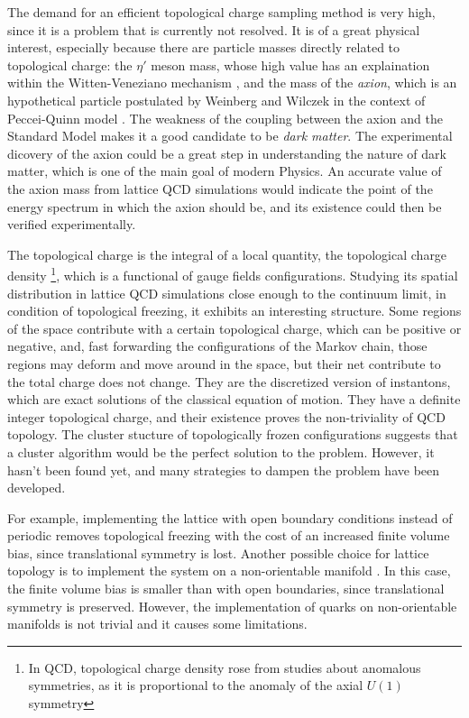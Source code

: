 The demand for an efficient topological charge sampling method is very high, since it is a problem that is currently not resolved.
It is of a great physical interest, especially because there are particle masses directly related to topological charge:
the $\eta'$ meson mass, whose high value has an explaination within the Witten-Veneziano mechanism \cite{witten:1979-1, witten:1979-2, veneziano:1979},
and the mass of the \emph{axion}, which is an hypothetical particle postulated by Weinberg \cite{weinberg:1978} and Wilczek \cite{wilczek:1978}
in the context of Peccei-Quinn model \cite{peccei-quinn:1977-1, peccei-quinn:1977-2}.
The weakness of the coupling between the axion and the Standard Model makes it a good candidate to be \emph{dark matter}.
The experimental dicovery of the axion could be a great step in understanding the nature of dark matter, which is one of the main goal of modern Physics.
An accurate value of the axion mass from lattice QCD simulations would indicate the point of the energy spectrum in which the axion should be,
and its existence could then be verified experimentally.

The topological charge is the integral of a local quantity, the topological charge density%
\footnote{In QCD, topological charge density rose from studies about anomalous symmetries, as it is proportional to the anomaly of the axial $U(1)$ symmetry},
which is a functional of gauge fields configurations.
Studying its spatial distribution in lattice QCD simulations close enough to the continuum limit, in condition of topological freezing, it exhibits an interesting structure.
Some regions of the space contribute with a certain topological charge, which can be positive or negative, and,
fast forwarding the configurations of the Markov chain,
those regions may deform and move around in the space, but their net contribute to the total charge does not change.
They are the discretized version of instantons, which are exact solutions of the classical equation of motion.
They have a definite integer topological charge, and their existence proves the non-triviality of QCD topology.
The cluster stucture of topologically frozen configurations suggests that a cluster algorithm would be the perfect solution to the problem.
However, it hasn't been found yet, and many strategies to dampen the problem have been developed.

For example, implementing the lattice with open boundary conditions instead of periodic \cite{luescher:2011}
removes topological freezing with the cost of an increased finite volume bias, since translational symmetry is lost.
Another possible choice for lattice topology is to implement the system on a non-orientable manifold \cite{mages:2017}.
In this case, the finite volume bias is smaller than with open boundaries, since translational symmetry is preserved.
However, the implementation of quarks on non-orientable manifolds is not trivial and it causes some limitations.


